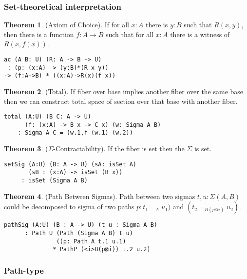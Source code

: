 \documentclass[twocolumn,10pt]{article}
\theoremstyle{definition}
\newtheorem{theorem}{Theorem}
\begin{document}
\subsubsection*{Set-theoretical interpretation}

\begin{theorem} (Axiom of Choice).
If for all $x : A$ there is $y : B$ such that $R(x,y)$,
then there is a function $f : A \rightarrow B$
such that for all $x : A$ there is a witness of $R(x,f(x))$.
\begin{lstlisting}
ac (A B: U) (R: A -> B -> U)
 : (p: (x:A) -> (y:B)*(R x y))
-> (f:A->B) * ((x:A)->R(x)(f x))
\end{lstlisting}
\end{theorem}

\begin{theorem} (Total).
If fiber over base implies another fiber
over the same base then we can construct total space of section
over that base with another fiber.
\begin{lstlisting}
total (A:U) (B C: A -> U)
      (f: (x:A) -> B x -> C x) (w: Sigma A B)
    : Sigma A C = (w.1,f (w.1) (w.2))
\end{lstlisting}
\end{theorem}

\begin{theorem} ($\Sigma$-Contractability). If the fiber is set then the $\Sigma$ is set.
\begin{lstlisting}
setSig (A:U) (B: A -> U) (sA: isSet A)
       (sB : (x:A) -> isSet (B x))
     : isSet (Sigma A B)
\end{lstlisting}
\end{theorem}

\begin{theorem} (Path Between Sigmas).
Path between two sigmas $t,u: \Sigma(A,B)$ could be decomposed to
sigma of two paths $p:t_1=_{A}u_1)$ and $(t_2=_{B(p@i)}u_2)$.
\begin{lstlisting}
pathSig (A:U) (B : A -> U) (t u : Sigma A B)
      : Path U (Path (Sigma A B) t u)
               ((p: Path A t.1 u.1)
              * PathP (<i>B(p@i)) t.2 u.2)
\end{lstlisting}
\end{theorem}

\subsubsection{Path-type}
\end{document}
